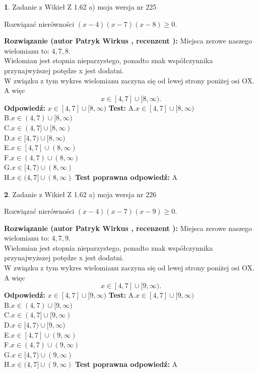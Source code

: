 \documentclass[12pt, a4paper]{article}
\theoremstyle{definition} %
\newtheorem{zad}{}
\newcommand{\zadStart}[1]{\begin{zad}#1\newline}
\newcommand{\zadStop}{\end{zad}}
\newcommand{\rozwStart}[2]{\noindent \textbf{Rozwiązanie (autor #1 , recenzent #2): }\newline}
\newcommand{\rozwStop}{\newline}
\newcommand{\odpStart}{\noindent \textbf{Odpowiedź:}\newline}
\newcommand{\odpStop}{\newline}
\newcommand{\testStart}{\noindent \textbf{Test:}\newline}
\newcommand{\testStop}{\newline}
\newcommand{\kluczStart}{\noindent \textbf{Test poprawna odpowiedź:}\newline}
\newcommand{\kluczStop}{\newline}
\begin{document}
\zadStart{Zadanie z Wikieł Z 1.62 a) moja wersja nr 225}

Rozwiązać nierówności $(x-4)(x-7)(x-8)\ge0$.
\zadStop
\rozwStart{Patryk Wirkus}{}
Miejsca zerowe naszego wielomianu to: $4, 7, 8$.\\
Wielomian jest stopnia nieparzystego, ponadto znak współczynnika przy\linebreak najwyższej potędze x jest dodatni.\\ W związku z tym wykres wielomianu zaczyna się od lewej strony poniżej osi OX. A więc $$x \in [4,7] \cup [8,\infty).$$
\rozwStop
\odpStart
$x \in [4,7] \cup [8,\infty)$
\odpStop
\testStart
A.$x \in [4,7] \cup [8,\infty)$\\
B.$x \in (4,7) \cup [8,\infty)$\\
C.$x \in (4,7] \cup [8,\infty)$\\
D.$x \in [4,7) \cup [8,\infty)$\\
E.$x \in [4,7] \cup (8,\infty)$\\
F.$x \in (4,7) \cup (8,\infty)$\\
G.$x \in [4,7) \cup (8,\infty)$\\
H.$x \in (4,7] \cup (8,\infty)$
\testStop
\kluczStart
A
\kluczStop



\zadStart{Zadanie z Wikieł Z 1.62 a) moja wersja nr 226}

Rozwiązać nierówności $(x-4)(x-7)(x-9)\ge0$.
\zadStop
\rozwStart{Patryk Wirkus}{}
Miejsca zerowe naszego wielomianu to: $4, 7, 9$.\\
Wielomian jest stopnia nieparzystego, ponadto znak współczynnika przy\linebreak najwyższej potędze x jest dodatni.\\ W związku z tym wykres wielomianu zaczyna się od lewej strony poniżej osi OX. A więc $$x \in [4,7] \cup [9,\infty).$$
\rozwStop
\odpStart
$x \in [4,7] \cup [9,\infty)$
\odpStop
\testStart
A.$x \in [4,7] \cup [9,\infty)$\\
B.$x \in (4,7) \cup [9,\infty)$\\
C.$x \in (4,7] \cup [9,\infty)$\\
D.$x \in [4,7) \cup [9,\infty)$\\
E.$x \in [4,7] \cup (9,\infty)$\\
F.$x \in (4,7) \cup (9,\infty)$\\
G.$x \in [4,7) \cup (9,\infty)$\\
H.$x \in (4,7] \cup (9,\infty)$
\testStop
\kluczStart
A
\kluczStop
\end{document}
